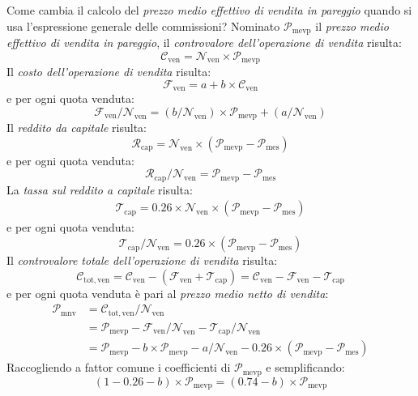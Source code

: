 \documentclass[12pt,a4paper]{article}
\newcommand{\Nven}[1]{\mathcal{N}_{\textrm{ven}#1}}
\newcommand{\Pme}[1]{\mathcal{P}_{\mathrm{me}#1}}
\newcommand{\Pmes}[1]{\Pme{\mathrm{s}#1}}
\newcommand{\Pmnv}[1]{\mathcal{P}_{\mathrm{mnv}#1}}
\newcommand{\Pmevp}[1]{\mathcal{P}_{\mathrm{mevp}#1}}
\newcommand{\Cven}[1]{\mathcal{C}_{\mathrm{ven}#1}}
\newcommand{\Ctotven}[1]{\mathcal{C}_{\mathrm{tot,ven}#1}}
\newcommand{\Rcap}[1]{\mathcal{R}_{\mathrm{cap}#1}}
\newcommand{\Tredcap}[1]{\mathcal{T}_{\mathrm{cap}#1}}
\newcommand{\Fven}[1]{\mathcal{F}_{\mathrm{ven}#1}}
\begin{document}
Come  cambia il  calcolo del  \emph{prezzo medio  effettivo di  vendita in  pareggio} quando  si usa
l'espressione generale delle  commissioni?  Nominato \(\Pmevp{}\) il  \emph{prezzo medio effettivo
   di vendita in pareggio}, il \emph{controvalore dell'operazione di vendita} risulta:
\begin{equation*}
  \Cven{} = \Nven{} \times{} \Pmevp{}
\end{equation*}
Il \emph{costo dell'operazione di vendita} risulta:
\begin{equation*}
  \Fven{} = a + b \times{} \Cven{}
\end{equation*}
e per ogni quota venduta:
\begin{equation*}
  \Fven{} / \Nven{}
  = \left(b / \Nven{}\right) \times{} \Pmevp{} + \left(a / \Nven{}\right)
\end{equation*}
Il \emph{reddito da capitale} risulta:
\begin{equation*}
  \Rcap{}
  = \Nven{} \times{} \left(\Pmevp{} - \Pmes{}\right)
\end{equation*}
e per ogni quota venduta:
\begin{equation*}
  \Rcap{} / \Nven{} = \Pmevp{} - \Pmes{}
\end{equation*}
La \emph{tassa sul reddito a capitale} risulta:
\begin{align*}
  \Tredcap{} = \num{0,26} \times{} \Nven{} \times{} \left(\Pmevp{} - \Pmes{}\right)
\end{align*}
e per ogni quota venduta:
\begin{equation*}
  \Tredcap{} / \Nven{}
  = \num{0,26} \times{} \left(\Pmevp{} - \Pmes{}\right)
\end{equation*}
Il \emph{controvalore totale dell'operazione di vendita} risulta:
\begin{equation*}
  \Ctotven{}
  = \Cven{} - \left( \Fven{} + \Tredcap{} \right) =  \Cven{} - \Fven{} - \Tredcap{}
\end{equation*}
e per ogni quota venduta è pari al \emph{prezzo medio netto di vendita}:
\begin{align*}
  \Pmnv{}
  &= \Ctotven{} / \Nven{}
  \\
  &= \Pmevp{} - \Fven{} / \Nven{} - \Tredcap{} / \Nven{}
    \\
  &= \Pmevp{}
    - b \times{} \Pmevp{} - a / \Nven{}
    - \num{0,26} \times{} \left(\Pmevp{} - \Pmes{}\right)
\end{align*}
Raccogliendo a fattor comune i coefficienti di \(\Pmevp{}\) e semplificando:
\begin{equation*}
  \left( 1 - \num{0,26} - b \right) \times{} \Pmevp{}
  = \left( \num{0,74} - b \right) \times{} \Pmevp{}
\end{equation*}
\end{document}
